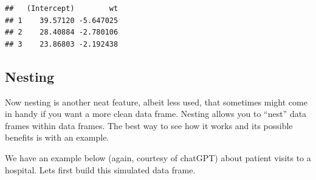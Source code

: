 \documentclass[
]{book}
\newenvironment{Shaded}{\begin{snugshade}}{\end{snugshade}}
\newcommand{\AttributeTok}[1]{\textcolor[rgb]{0.77,0.63,0.00}{#1}}
\newcommand{\CommentTok}[1]{\textcolor[rgb]{0.56,0.35,0.01}{\textit{#1}}}
\newcommand{\FunctionTok}[1]{\textcolor[rgb]{0.00,0.00,0.00}{#1}}
\newcommand{\NormalTok}[1]{#1}
\newcommand{\SpecialCharTok}[1]{\textcolor[rgb]{0.00,0.00,0.00}{#1}}
\begin{document}
\begin{Shaded}
\end{Shaded}

\begin{verbatim}
##   (Intercept)        wt
## 1    39.57120 -5.647025
## 2    28.40884 -2.780106
## 3    23.86803 -2.192438
\end{verbatim}

\hypertarget{nesting}{%
\subsection{Nesting}\label{nesting}}

Now nesting is another neat feature, albeit less used, that sometimes might come in handy if you want a more clean data frame.
Nesting allows you to ``nest'' data frames within data frames.
The best way to see how it works and its possible benefits is with an example.

We have an example below (again, courtesy of chatGPT) about patient visits to a hospital.
Lets first build this simulated data frame.
\end{document}
